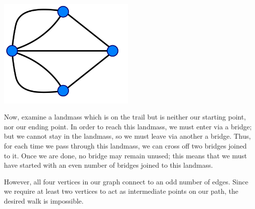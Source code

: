 \documentclass[11pt]{article}
\theoremstyle{definition}
\theoremstyle{remark}
\numberwithin{equation}{section}
\begin{document}
    \begin{center}
        \includegraphics[width=0.5\textwidth]{7_bridges_graph.png}
    \end{center}

    Now, examine a landmass which is on the trail but is neither our starting point,
    nor our ending point. In order to reach this landmass, we must enter via a bridge; but
    we cannot stay in the landmass, so we must leave via another a bridge. Thus, for
    each time we pass through this landmass, we can cross off two bridges joined to
    it. Once we are done, no bridge may remain unused; this means that we must have
    started with an even number of bridges joined to this landmass.

    However, all four vertices in our graph connect to an odd number of edges. Since
    we require at least two vertices to act as intermediate points on our path, the
    desired walk is impossible.
\end{document}
